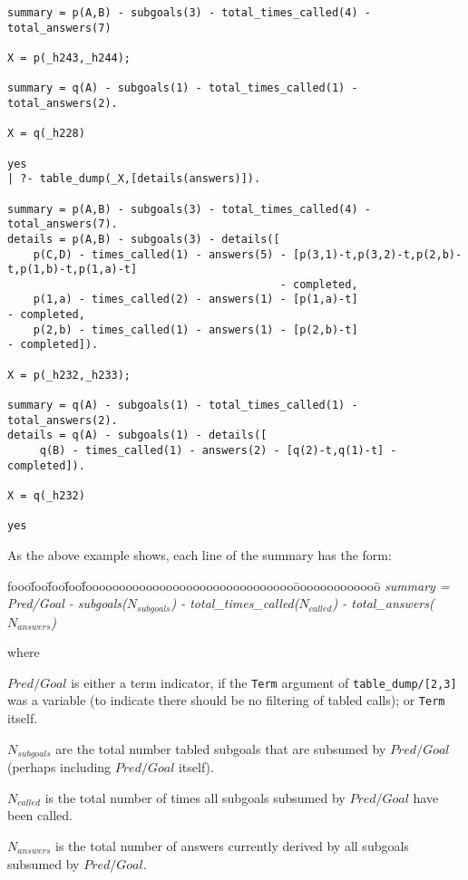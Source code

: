\begin{description}
{\begin{verbatim}
summary = p(A,B) - subgoals(3) - total_times_called(4) - total_answers(7)

X = p(_h243,_h244);

summary = q(A) - subgoals(1) - total_times_called(1) - total_answers(2).

X = q(_h228)

yes
| ?- table_dump(_X,[details(answers)]).

summary = p(A,B) - subgoals(3) - total_times_called(4) - total_answers(7).
details = p(A,B) - subgoals(3) - details([
    p(C,D) - times_called(1) - answers(5) - [p(3,1)-t,p(3,2)-t,p(2,b)-t,p(1,b)-t,p(1,a)-t] 
                                          - completed,
    p(1,a) - times_called(2) - answers(1) - [p(1,a)-t]                         - completed,
    p(2,b) - times_called(1) - answers(1) - [p(2,b)-t]                         - completed]).

X = p(_h232,_h233);

summary = q(A) - subgoals(1) - total_times_called(1) - total_answers(2).
details = q(A) - subgoals(1) - details([
     q(B) - times_called(1) - answers(2) - [q(2)-t,q(1)-t] - completed]).

X = q(_h232)

yes
\end{verbatim}
}

As the above example shows, each line of the summary has the form:

\begin{tabbing}
fooo\=foo\=foo\=foo\=fooooooooooooooooooooooooooooooo\=ooooooooooooo\=\kill
%
{\em   summary = } \\
\> {\em Pred/Goal  - subgoals($N_{subgoals}$) - total\_times\_called($N_{called}$) - total\_answers($N_{answers}$)}
%
\end{tabbing}
where 
\bi
\item $Pred/Goal$ is either a term indicator, if the {\tt Term}
  argument of {\tt table\_dump/[2,3]} was a variable (to indicate there
  should be no filtering of tabled calls); or {\tt Term} itself.
%
\item $N_{subgoals}$ are the total number tabled subgoals that are
  subsumed by $Pred/Goal$ (perhaps including $Pred/Goal$ itself).
%
\item $N_{called}$ is the total number of times all subgoals subsumed
  by $Pred/Goal$ have been called.
%
\item $N_{answers}$ is the total number of answers currently derived
  by all subgoals subsumed by $Pred/Goal$.
\ei


\end{description}
